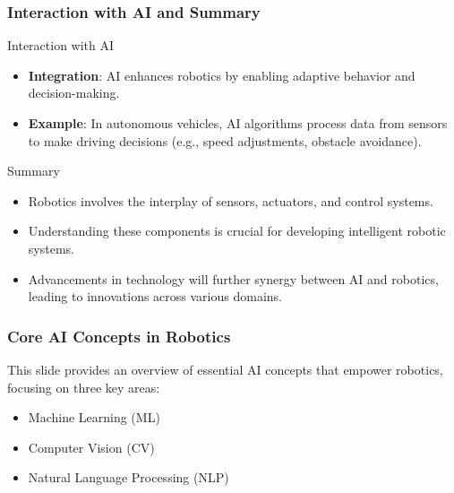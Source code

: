 \documentclass[aspectratio=169]{beamer}
\begin{document}
\begin{frame}[fragile]
    \frametitle{Interaction with AI and Summary}
    \begin{block}{Interaction with AI}
        \begin{itemize}
            \item \textbf{Integration}: AI enhances robotics by enabling adaptive behavior and decision-making.
            \item \textbf{Example}: In autonomous vehicles, AI algorithms process data from sensors to make driving decisions (e.g., speed adjustments, obstacle avoidance).
        \end{itemize}
    \end{block}

    \begin{block}{Summary}
        \begin{itemize}
            \item Robotics involves the interplay of sensors, actuators, and control systems.
            \item Understanding these components is crucial for developing intelligent robotic systems.
            \item Advancements in technology will further synergy between AI and robotics, leading to innovations across various domains.
        \end{itemize}
    \end{block}
\end{frame}

\begin{frame}[fragile]
    \frametitle{Core AI Concepts in Robotics}
    This slide provides an overview of essential AI concepts that empower robotics, focusing on three key areas:
    \begin{itemize}
        \item Machine Learning (ML)
        \item Computer Vision (CV)
        \item Natural Language Processing (NLP)
    \end{itemize}
\end{frame}
\end{document}
